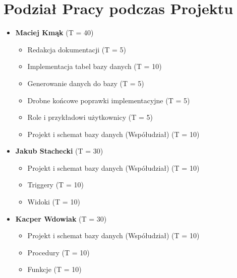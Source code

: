 \documentclass[12pt]{article}
\begin{document}
\section*{Podział Pracy podczas Projektu}

\begin{itemize}
    \item \textbf{Maciej Kmąk} (T = 40)
    \begin{itemize}
        \item Redakcja dokumentacji (T = 5)
        \item Implementacja tabel bazy danych (T = 10)
        \item Generowanie danych do bazy (T = 5)
        \item Drobne końcowe poprawki implementacyjne (T = 5)
        \item Role i przykładowi użytkownicy (T = 5)
        \item Projekt i schemat bazy danych (Współudział) (T = 10)
    \end{itemize}
    \item \textbf{Jakub Stachecki} (T = 30)
    \begin{itemize}
        \item Projekt i schemat bazy danych (Współudział) (T = 10)
        \item Triggery (T = 10)
        \item Widoki (T = 10)
    \end{itemize}
    \item \textbf{Kacper Wdowiak} (T = 30)
    \begin{itemize}
        \item Projekt i schemat bazy danych (Współudział) (T = 10)
        \item Procedury (T = 10)
        \item Funkcje (T = 10)
    \end{itemize}
\end{itemize}
\end{document}

